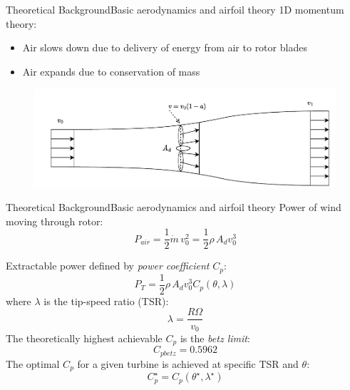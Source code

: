 
\begin{frame}{Theoretical Background}{Basic aerodynamics and airfoil theory}
	1D momentum theory:
	\begin{itemize}
		\item Air slows down due to delivery of energy from air to rotor blades
		\item Air expands due to conservation of mass
	\end{itemize}

	\begin{figure}[ht]
		\centering
		\includegraphics[width=1\linewidth]{../Graphics/FlowThroughRotor.pdf}
		\label{fig:betz}
	\end{figure}
\end{frame}


\begin{frame}{Theoretical Background}{Basic aerodynamics and airfoil theory}
	Power of wind moving through rotor:
	\begin{equation} \label{eq:power}
		P_{air} = \dfrac{1}{2} \dot{m} \, v_0^2 = \dfrac{1}{2}\rho \, A_d v_0^3
	\end{equation}
	
	Extractable power defined by \textit{power coefficient} $ C_p $:
	\begin{equation}\label{eq:power_w_Cp}
		P_{T} = \dfrac{1}{2} \rho \, A_d v_0^3 C_p(\theta, \lambda)
	\end{equation}
	where $ \lambda $ is the tip-speed ratio (TSR):
	\begin{equation}\label{key}
		\lambda = \dfrac{R \Omega}{v_0}
	\end{equation}
	The theoretically highest achievable $ C_p $ is the \textit{betz limit}:
	\begin{equation}\label{eq:betzlimit}
		C_{pbetz} = 0.5962
	\end{equation}
	The optimal $ C_p $ for a given turbine is achieved at specific TSR and $ \theta $:
	\begin{equation}\label{eq:cp_optimal}
		C_p^\star = C_p(\theta^\star, \lambda^\star)
	\end{equation}
\end{frame}


